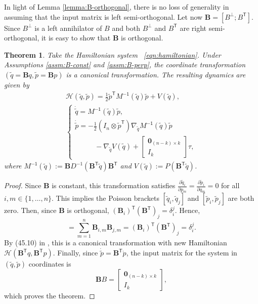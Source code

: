 \documentclass[journal,twoside,web]{ieeecolor}
\newtheorem{thm}{Theorem}%
\newcommand*{\tpose}{^\mathsf{T}}
\newcommand*{\Minv}{M^\mathsf{-1}}
\newcommand*{\Id}[1]{I_{#1}}
\newcommand*{\Zmat}[1]{\bm{0}_{#1}}
\newcommand*{\pdiff}[2]{\frac{\partial #1}{\partial #2}}
\newcommand*{\simpleB}{\begin{bmatrix}\Zmat{(n-k)\times k}\\ \Id{k}\end{bmatrix}}
\begin{document}
In light of Lemma \ref{lemma:B-orthogonal}, there is no loss of generality in
assuming that the input matrix is left semi-orthogonal.
Let now \(\mathbf{B} = [B^\perp; B\tpose]\).
Since \(B^\perp\) is a left annihilator of \(B\) and both \(B^\perp\) and
\(B\tpose\) are right semi-orthogonal, it is easy to show that \(\mathbf{B}\) is
orthogonal.

\begin{thm}\label{thm:simply-actuated}
    Take the Hamiltonian system ~\eqref{eqn:hamiltonian}.
    Under Assumptions \ref{assm:B-const} and \ref{assm:B-perp},
    the coordinate transformation
    \(\left(\tilde{q} = \mathbf{B}q, \tilde{p} = \mathbf{B}p\right)\)
    is a canonical transformation.
    The resulting dynamics are given by 
    \begin{gather}\label{eqn:simple-hamiltonian}
        \mathcal{H}(\tilde{q},\tilde{p}) = 
        \frac{1}{2} \tilde{p}\tpose \Minv(\tilde{q}) \tilde{p} + V(\tilde{q})
        , \\
       \begin{cases}
           \dot{\tilde{q}} = \Minv(\tilde{q})\tilde{p}
           , \\
           \dot{\tilde{p}} = -\frac{1}{2} (\Id{n} \otimes \tilde{p}\tpose)
           \nabla_{\tilde{q}} \Minv(\tilde{q}) \tilde{p} \\
           \phantom{---} - \nabla_{\tilde{q}} V(\tilde{q}) + \simpleB \tau
            ,
        \end{cases} \nonumber
    \end{gather}
    where 
    \(\Minv(\tilde{q}) := 
    \mathbf{B}D^{-1}(\mathbf{B}\tpose \tilde{q})\mathbf{B}\tpose\)
    and
    \(V(\tilde{q}) := P(\mathbf{B}\tpose \tilde{q})\).
\end{thm}
\begin{proof}
    Since \(\mathbf{B}\) is constant, this transformation satisfies
    \(\pdiff{\tilde{q}_i}{p_m} = \pdiff{\tilde{p}_i}{q_m} = 0\) for all 
    \(i,m \in \{1,\ldots,n\}\).
    This implies the Poisson brackets \([\tilde{q}_i, \tilde{q}_j]\)
    and \([\tilde{p}_i,\tilde{p}_j]\) are both zero.
    Then, since \(\mathbf{B}\) is orthogonal, 
    \((\mathbf{B}_i)\tpose (\mathbf{B}\tpose)_j = \delta_i^j\).
    Hence, 
    \begin{equation*}
        [\tilde{p}_i, \tilde{q}_j]
            = \sum\limits_{m=1}^n \mathbf{B}_{i,m}\mathbf{B}_{j,m} 
            = (\mathbf{B}_i)\tpose (\mathbf{B}\tpose)_j
            = \delta_i^j
            .
    \end{equation*}
    By (45.10) in \cite{landau_mechanics}, this is a canonical transformation
    with new Hamiltonian
    \(\mathcal{H}(\mathbf{B}\tpose q, \mathbf{B}\tpose p)\).
    Finally, since \(\dot{\tilde{p}} = \mathbf{B}\tpose \dot{p}\), the input
    matrix for the system in \((\tilde{q},\tilde{p})\) coordinates is
    \[
        \mathbf{B}B = \simpleB
        ,
    \]
    which proves the theorem.
\end{proof}
\end{document}
